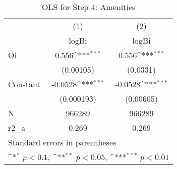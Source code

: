 \begin{table}[htbp]\centering
\def\sym#1{\ifmmode^{#1}\else\(^{#1}\)\fi}
\caption{OLS for Step 4: Amenities \label{Q26Tab1}}
\begin{tabular}{l*{2}{c}}
\toprule
                    &\multicolumn{1}{c}{(1)}&\multicolumn{1}{c}{(2)}\\
                    &\multicolumn{1}{c}{logBi}&\multicolumn{1}{c}{logBi}\\
\midrule
Oi                  &       0.556\sym{***}&       0.556\sym{***}\\
                    &   (0.00105)         &    (0.0331)         \\
\addlinespace
Constant            &     -0.0528\sym{***}&     -0.0528\sym{***}\\
                    &  (0.000193)         &   (0.00605)         \\
\midrule
N                   &      966289         &      966289         \\
r2\_a                &       0.269         &       0.269         \\
\bottomrule
\multicolumn{3}{l}{\footnotesize Standard errors in parentheses}\\
\multicolumn{3}{l}{\footnotesize \sym{*} \(p<0.1\), \sym{**} \(p<0.05\), \sym{***} \(p<0.01\)}\\
\end{tabular}
\end{table}

